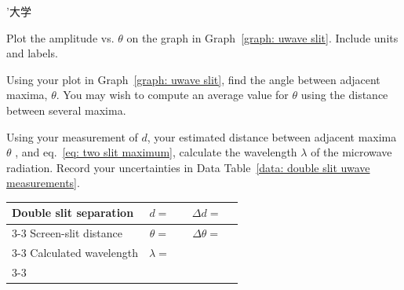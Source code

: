 ’大学\documentclass[addpoints]{physlabs}
\begin{document}
\begin{postlab}
    \filbreak
    \question[2] Plot the amplitude vs. $\theta$ on the graph in Graph~\ref{graph: uwave slit}. Include units and labels.

    \begin{center}
    \captionsetup{font=normalsize}
    \end{center}

    \filbreak
    \question[1] Using your plot in Graph~\ref{graph: uwave slit}, find the angle between adjacent maxima, $\theta$. You may wish to compute an average value for $\theta$ using the distance between several maxima.
    \begin{solution}[3cm]
        
    \end{solution}

    \filbreak
    \question[1] Using your measurement of $d$, your estimated distance between adjacent maxima $\theta$ , and eq.~\ref{eq: two slit maximum}, calculate the wavelength $\lambda$ of the microwave radiation. Record your uncertainties in Data Table~\ref{data: double slit uwave measurements}.
    \begin{center}
        \renewcommand{\arraystretch}{2}
        \captionsetup{font=normalsize}
        \begin{tabular}{lc>{\centering\arraybackslash}p{3cm}cp{3cm}}
            \hline
            Double slit separation & $d=$  & & $\Delta d=$ &
            \\
            \cline{3-3}\cline{5-5}
            Screen-slit distance & $\theta=$ & & $\Delta \theta=$ &
            \\
            \cline{3-3}\cline{5-5}
            Calculated wavelength & $\lambda=$ & & &
            \\
            \cline{3-3}
        \end{tabular}
    \end{center}


\end{postlab}
\end{document}
